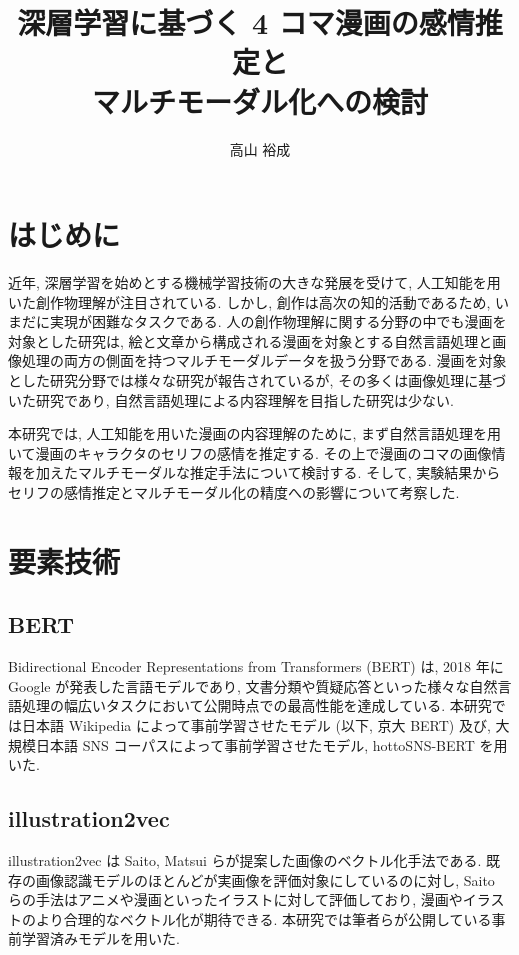\documentclass[a4paper,twoside,twocolumn,10pt]{jarticle}     %
\title{深層学習に基づく 4 コマ漫画の感情推定と\\マルチモーダル化への検討}
\author{高山 裕成}
\begin{document}
\maketitle %
\small

\section{はじめに}
近年, 深層学習を始めとする機械学習技術の大きな発展を受けて, 人工知能を用いた創作物理解が注目されている.
しかし, 創作は高次の知的活動であるため, いまだに実現が困難なタスクである.
人の創作物理解に関する分野の中でも漫画を対象とした研究は,
絵と文章から構成される漫画を対象とする自然言語処理と画像処理の両方の側面を持つマルチモーダルデータを扱う分野である.
漫画を対象とした研究分野では様々な研究が報告されているが,
その多くは画像処理に基づいた研究であり,
自然言語処理による内容理解を目指した研究は少ない.

本研究では, 人工知能を用いた漫画の内容理解のために,
まず自然言語処理を用いて漫画のキャラクタのセリフの感情を推定する.
その上で漫画のコマの画像情報を加えたマルチモーダルな推定手法について検討する.
そして, 実験結果からセリフの感情推定とマルチモーダル化の精度への影響について考察した.
\section{要素技術}
\subsection{BERT}
Bidirectional Encoder Representations from Transformers (BERT)
 \cite{devlin2018bert} は, 2018 年に Google が発表した言語モデルであり,
 文書分類や質疑応答といった様々な自然言語処理の幅広いタスクにおいて公開時点での最高性能を達成している. 本研究では日本語 Wikipedia によって事前学習させたモデル \cite{kyoto-bert} (以下, 京大 BERT) 及び, 大規模日本語 SNS コーパスによって事前学習させたモデル, hottoSNS-BERT \cite{hottoSNS-bert} を用いた.

\subsection{illustration2vec}
illustration2vec \cite{i2v} は Saito, Matsui らが提案した画像のベクトル化手法である. 既存の画像認識モデルのほとんどが実画像を評価対象にしているのに対し, Saito らの手法はアニメや漫画といったイラストに対して評価しており, 漫画やイラストのより合理的なベクトル化が期待できる. 本研究では筆者らが公開している事前学習済みモデルを用いた.
\end{document}
